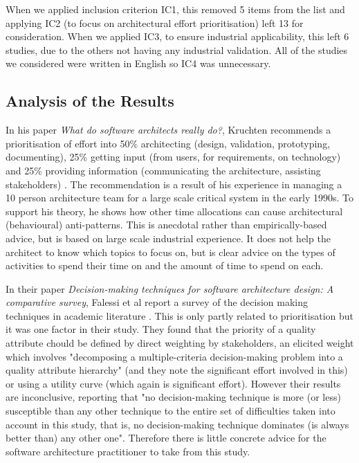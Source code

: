 When we applied inclusion criterion IC1, this removed 5 items from the list and applying IC2 (to focus on architectural effort prioritisation) left 13 for consideration.  When we applied IC3, to ensure industrial applicability, this left 6 studies, due to the others not having any industrial validation.  All of the studies we considered were written in English so IC4 was unnecessary.

\subsection{Analysis of the Results}

In his paper \emph{What do software architects really do?}, Kruchten recommends a prioritisation of effort into 50\% architecting (design, validation, prototyping, documenting), 25\% getting input (from users, for requirements, on technology) and 25\% providing information (communicating the architecture, assisting stakeholders) \cite{kruchten2008-architectsdo}. The recommendation is a result of his experience in managing a 10 person architecture team for a large scale critical system in the early 1990s.  To support his theory, he shows how other time allocations can cause architectural (behavioural) anti-patterns.  This is anecdotal rather than empirically-based advice, but is based on large scale industrial experience.  It does not help the architect to know which topics to focus on, but is clear advice on the types of activities to spend their time on and the amount of time to spend on each.

In their paper \emph{Decision-making techniques for software architecture design: A comparative survey}, Falessi et al report a survey of the decision making techniques in academic literature \cite{falessi2011-archdecisionsurvey}.  This is only partly related to prioritisation but it was one factor in their study.  They found that the priority of a quality attribute chould be defined by direct weighting by stakeholders, an elicited weight which involves "decomposing a multiple-criteria decision-making problem into a quality attribute hierarchy" (and they note the significant effort involved in this) or using a utility curve (which again is significant effort).  However their results are inconclusive, reporting that "no decision-making technique is more (or less) susceptible than any other technique to the entire set of difficulties taken into account in this study, that is, no decision-making technique dominates (is always better than) any other one".  Therefore there is little concrete advice for the software architecture practitioner to take from this study.

